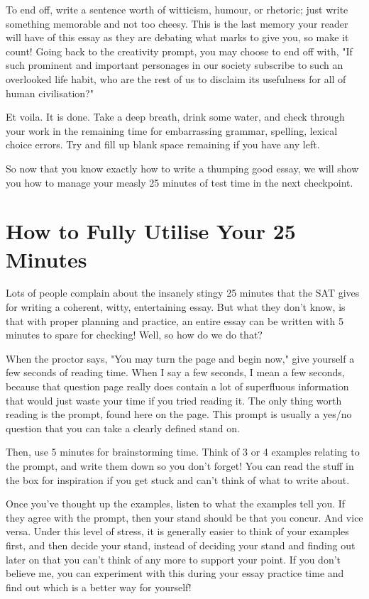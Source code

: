 \documentclass[DIV=calc,11pt,parskip,numbers=noenddot]{scrartcl} %
\begin{document}
To end off, write a sentence worth of witticism, humour, or rhetoric; just write something memorable and not too cheesy. This is the last memory your reader will have of this essay as they are debating what marks to give you, so make it count! Going back to the creativity prompt, you may choose to end off with, "If such prominent and important personages in our society subscribe to such an overlooked life habit, who are the rest of us to disclaim its usefulness for all of human civilisation?"

Et voila. It is done. Take a deep breath, drink some water, and check through your work in the remaining time for embarrassing grammar, spelling, lexical choice errors. Try and fill up blank space remaining if you have any left.

So now that you know exactly how to write a thumping good essay, we will show you how to manage your measly 25 minutes of test time in the next checkpoint.
\section{How to Fully Utilise Your 25 Minutes}
Lots of people complain about the insanely stingy 25 minutes that the SAT gives for writing a coherent, witty, entertaining essay. But what they don’t know, is that with proper planning and practice, an entire essay can be written with 5 minutes to spare for checking! Well, so how do we do that?

When the proctor says, "You may turn the page and begin now," give yourself a few seconds of reading time. When I say a few seconds, I mean a few seconds, because that question page really does contain a lot of superfluous information that would just waste your time if you tried reading it. The only thing worth reading is the prompt, found here on the page. This prompt is usually a yes/no question that you can take a clearly defined stand on. 

Then, use 5 minutes for brainstorming time. Think of 3 or 4 examples relating to the prompt, and write them down so you don’t forget! You can read the stuff in the box for inspiration if you get stuck and can’t think of what to write about. 

Once you’ve thought up the examples, listen to what the examples tell you. If they agree with the prompt, then your stand should be that you concur. And vice versa. Under this level of stress, it is generally easier to think of your examples first, and then decide your stand, instead of deciding your stand and finding out later on that you can’t think of any more to support your point. If you don’t believe me, you can experiment with this during your essay practice time and find out which is a better way for yourself!
\end{document}
